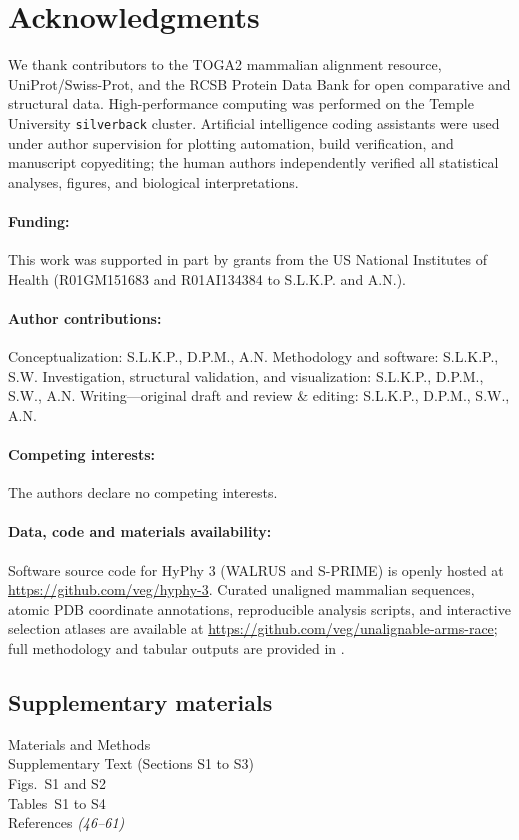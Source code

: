 \documentclass[12pt]{article}
\begin{document}
\clearpage




\section*{Acknowledgments}
We thank contributors to the TOGA2 mammalian alignment resource, UniProt/Swiss-Prot, and the RCSB Protein Data Bank for open comparative and structural data. High-performance computing was performed on the Temple University \texttt{silverback} cluster. Artificial intelligence coding assistants were used under author supervision for plotting automation, build verification, and manuscript copyediting; the human authors independently verified all statistical analyses, figures, and biological interpretations.
\paragraph*{Funding:}
This work was supported in part by grants from the US National Institutes of Health (R01GM151683 and R01AI134384 to S.L.K.P. and A.N.).
\paragraph*{Author contributions:}
Conceptualization: S.L.K.P., D.P.M., A.N. Methodology and software: S.L.K.P., S.W. Investigation, structural validation, and visualization: S.L.K.P., D.P.M., S.W., A.N. Writing---original draft and review \& editing: S.L.K.P., D.P.M., S.W., A.N.
\paragraph*{Competing interests:}
The authors declare no competing interests.
\paragraph*{Data, code and materials availability:}
Software source code for HyPhy 3 (WALRUS and S-PRIME) is openly hosted at \url{https://github.com/veg/hyphy-3}. Curated unaligned mammalian sequences, atomic PDB coordinate annotations, reproducible analysis scripts, and interactive selection atlases are available at \url{https://github.com/veg/unalignable-arms-race}; full methodology and tabular outputs are provided in \cite{methods}.

\subsection*{Supplementary materials}
Materials and Methods\\
Supplementary Text (Sections S1 to S3)\\
Figs.~S1 and S2\\
Tables~S1 to S4\\
References \textit{(46--61)}
\end{document}
